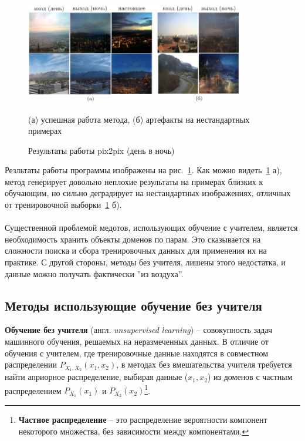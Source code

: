 \documentclass[11pt,a4paper]{extarticle}
\begin{document}
			\begin{figure}[ht]
				\centering
				\includegraphics[width=0.85\textwidth]{img/pix2pix_res}
				\caption{Результаты работы pix2pix (день в ночь)}{
					\small{
					(а) успешная работа метода,
					(б) артефакты на нестандартных примерах
				}}
				\label{pic:pix2pix_results}
			\end{figure}
			\noindent
			Резльтаты работы программы изображены на рис.~\ref{pic:pix2pix_results}.
			Как можно видеть~\ref{pic:pix2pix_results} а), метод генерирует довольно неплохие результаты на примерах близких к обучающим,
			но сильно деградирует на нестандартных изображениях, отличных от тренировочной выборки~\ref{pic:pix2pix_results} б). 
			\\\\Существенной проблемой медотов, использующих обучение с учителем, является необходимость хранить объекты доменов по парам.
			Это сказывается на сложности поиска и сбора тренировочных данных для применения их на практике.
			С другой стороны, методы без учителя, лишены этого недостатка, и данные можно получать фактически ''из воздуха''.
			
			
	\subsection{Методы использующие обучение без учителя}

		\textbf{Обучение без учителя} (англ. \textit{unsupervised learning}) -- совокупность задач машинного обучения, решаемых на неразмеченных данных.
		В отличие от обучения с учителем, где тренировочные данные находятся в совместном распределении \(P_{X_{1},X_{2}}(x_{1},x_{2})\), в методах без вмешательства учителя требуется
		найти априорное распределение, выбирая данные (\(x_{1},x_{2}\)) из доменов с частным распределением \(P_{X_{1}}(x_{1})\) и  \(P_{X_{2}}(x_{2})\)\footnote{
			\textbf{Частное распределение} -- это распределение вероятности компонент некоторого множества, без зависимости между компонентами.
		}.
\end{document}
